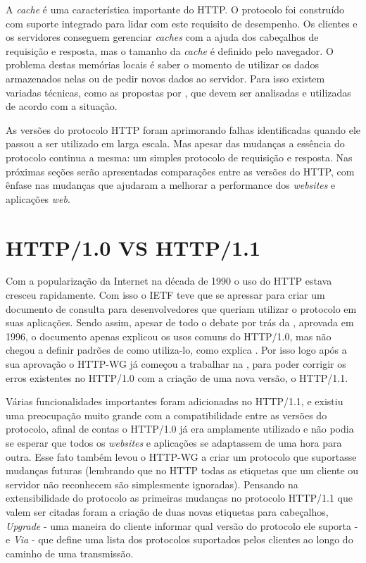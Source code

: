

A \textit{cache} é uma característica importante do HTTP. O protocolo foi construído com suporte integrado para lidar com este requisito de desempenho. Os clientes e os servidores conseguem gerenciar \textit{caches} com a ajuda dos cabeçalhos de requisição e resposta, mas o tamanho da \textit{cache} é definido pelo navegador. O problema destas memórias locais é saber o momento de utilizar os dados armazenados nelas ou de pedir novos dados ao servidor. Para isso existem variadas técnicas, como as propostas por \cite{HighPerformance}, que devem ser analisadas e utilizadas de acordo com a situação.

As versões do protocolo HTTP foram aprimorando falhas identificadas quando ele passou a ser utilizado em larga escala. Mas apesar das mudanças a essência do protocolo continua a mesma: um simples protocolo de requisição e resposta. Nas próximas seções serão apresentadas comparações entre as versões do HTTP, com ênfase nas mudanças que ajudaram a melhorar a performance dos \textit{websites} e aplicações \textit{web}.

\section{HTTP/1.0 VS HTTP/1.1}
\label{sec:http_10_vs_http_11}

Com a popularização da Internet na década de 1990 o uso do HTTP estava cresceu rapidamente. Com isso o IETF teve que se apressar para criar um documento de consulta para desenvolvedores que queriam utilizar o protocolo em suas aplicações. Sendo assim, apesar de todo o debate por trás da \cite{RFC1945}, aprovada em 1996, o documento apenas explicou os usos comuns do HTTP/1.0, mas não chegou a definir padrões de como utiliza-lo, como explica \cite{KeyDifferencesHTTP}. Por isso logo após a sua aprovação o HTTP-WG já começou a trabalhar na \cite{RFC2616}, para poder corrigir os erros existentes no HTTP/1.0 com a criação de uma nova versão, o HTTP/1.1.

Várias funcionalidades importantes foram adicionadas no HTTP/1.1, e existiu uma preocupação muito grande com a compatibilidade entre as versões do protocolo, afinal de contas o HTTP/1.0 já era amplamente utilizado e não podia se esperar que todos os \textit{websites} e aplicações se adaptassem de uma hora para outra. Esse fato também levou o HTTP-WG a criar um protocolo que suportasse mudanças futuras (lembrando que no HTTP todas as etiquetas que um cliente ou servidor não reconhecem são simplesmente ignoradas). Pensando na extensibilidade do protocolo as primeiras mudanças no protocolo HTTP/1.1 que valem ser citadas foram a criação de duas novas etiquetas para cabeçalhos, \textit{Upgrade} - uma maneira do cliente informar qual versão do protocolo ele suporta - e \textit{Via} - que define uma lista dos protocolos suportados pelos clientes ao longo do caminho de uma transmissão.

